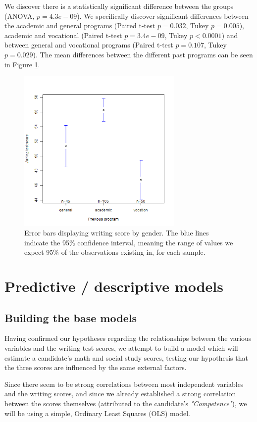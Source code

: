 \documentclass[10pt, a4paper]{article}
\begin{document}
	We discover there is a statistically significant difference between the groups (ANOVA, $p=4.3e-09$). We specifically discover significant differences between the academic and general programs (Paired t-test $p=0.032$, Tukey $p=0.005$), academic and vocational (Paired t-test $p=3.4e-09$, Tukey $p<0.0001$) and between general and vocational programs (Paired t-test $p=0.107$, Tukey $p=0.029$). The mean differences between the different past programs can be seen in Figure \ref{fig::write_prog_error}.
	
	\begin{figure}
		\includegraphics[width=8cm]{write_prog_error_plot.png}
		\centering
		\caption{Error bars displaying writing score by gender. The blue lines indicate the 95\% confidence interval, meaning the range of values we expect 95\% of the observations existing in, for each sample.}
		\label{fig::write_prog_error}
	\end{figure}
	
	\section{Predictive / descriptive models}
	\label{sec::models}
	
	\subsection{Building the base models}
	Having confirmed our hypotheses regarding the relationships between the various variables and the writing test scores, we attempt to build a model which will estimate a candidate's math and social study scores, testing our hypothesis that the three scores are influenced by the same external factors. 
	
	Since there seem to be strong correlations between most independent variables and the writing scores, and since we already established a strong correlation between the scores themselves (attributed to the candidate's \textit{"Competence"}), we will be using a simple, Ordinary Least Squares (OLS) model.
	
\end{document}
